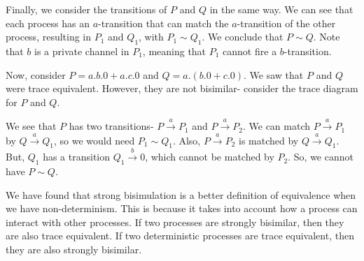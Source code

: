 \documentclass[a4paper, openany]{memoir}
\theoremstyle{definition}
\begin{document}
    Finally, we consider the transitions of $P$ and $Q$ in the same way. We can see that each process has an $a$-transition that can match the $a$-transition of the other process, resulting in $P_1$ and $Q_1$, with $P_1 \sim Q_1$. We conclude that $P \sim Q$. Note that $b$ is a private channel in $P_1$, meaning that $P_1$ cannot fire a $b$-transition.

    Now, consider $P = a.b.0 + a.c.0$ and $Q = a.(b.0 + c.0)$. We saw that $P$ and $Q$ were trace equivalent. However, they are not bisimilar- consider the trace diagram for $P$ and $Q$.
    \begin{figure}[H]
        \centering
    \end{figure}
    \noindent We see that $P$ has two transitions- $P \xrightarrow{a} P_1$ and $P \xrightarrow{a} P_2$. We can match $P \xrightarrow{a} P_1$ by $Q \xrightarrow{a} Q_1$, so we would need $P_1 \sim Q_1$. Also, $P \xrightarrow{a} P_2$ is matched by $Q \xrightarrow{a} Q_1$. But, $Q_1$ has a transition $Q_1 \xrightarrow{b} 0$, which cannot be matched by $P_2$. So, we cannot have $P \sim Q$.

    We have found that strong bisimulation is a better definition of equivalence when we have non-determinism. This is because it takes into account how a process can interact with other processes. If two processes are strongly bisimilar, then they are also trace equivalent. If two deterministic processes are trace equivalent, then they are also strongly bisimilar.
\end{document}

